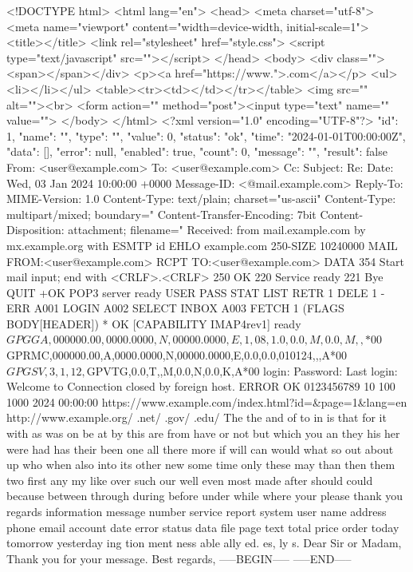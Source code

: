 {\begin{verbatim*}
<!DOCTYPE html>
<html lang="en">
<head>
<meta charset="utf-8">
<meta name="viewport" content="width=device-width, initial-scale=1">
<title></title>
<link rel="stylesheet" href="style.css">
<script type="text/javascript" src=""></script>
</head>
<body>
<div class=""><span></span></div>
<p><a href="https://www.">.com</a></p>
<ul><li></li></ul>
<table><tr><td></td></tr></table>
<img src="" alt=""><br>
<form action="" method="post"><input type="text" name="" value="">
</body>
</html>
<?xml version="1.0" encoding="UTF-8"?>
{"id": 1, "name": "", "type": "", "value": 0, "status": "ok",
 "time": "2024-01-01T00:00:00Z", "data": [], "error": null,
 "enabled": true, "count": 0, "message": "", "result": false}
From: <user@example.com>
To: <user@example.com>
Cc: 
Subject: Re: 
Date: Wed, 03 Jan 2024 10:00:00 +0000
Message-ID: <@mail.example.com>
Reply-To: 
MIME-Version: 1.0
Content-Type: text/plain; charset="us-ascii"
Content-Type: multipart/mixed; boundary="
Content-Transfer-Encoding: 7bit
Content-Disposition: attachment; filename="
Received: from mail.example.com by mx.example.org with ESMTP id
EHLO example.com
250-SIZE 10240000
MAIL FROM:<user@example.com>
RCPT TO:<user@example.com>
DATA
354 Start mail input; end with <CRLF>.<CRLF>
250 OK
220 Service ready
221 Bye
QUIT
+OK POP3 server ready
USER 
PASS 
STAT
LIST
RETR 1
DELE 1
-ERR 
A001 LOGIN 
A002 SELECT INBOX
A003 FETCH 1 (FLAGS BODY[HEADER])
* OK [CAPABILITY IMAP4rev1] ready
$GPGGA,000000.00,0000.0000,N,00000.0000,E,1,08,1.0,0.0,M,0.0,M,,*00
$GPRMC,000000.00,A,0000.0000,N,00000.0000,E,0.0,0.0,010124,,,A*00
$GPGSV,3,1,12,
$GPVTG,0.0,T,,M,0.0,N,0.0,K,A*00
login: 
Password: 
Last login: 
Welcome to 
Connection closed by foreign host.
ERROR
OK
0123456789 10 100 1000 2024 00:00:00
https://www.example.com/index.html?id=&page=1&lang=en
http://www.example.org/ .net/ .gov/ .edu/
The 
the and of to in is that for it with as was on be at by this are from
 have or not but which you an they his her were had has their been
 one all there more if will can would what so out about up who when
 also into its other new some time only these may than then them two
 first any my like over such our well even most made after should
 could because between through during before under while where your
 please thank you regards information message number service report
 system user name address phone email account date error status
 data file page text total price order today tomorrow yesterday
ing tion ment ness able ally ed. es, ly s. 
Dear Sir or Madam,
Thank you for your message. Best regards,
-----BEGIN-----
-----END-----
\end{verbatim*}
}

